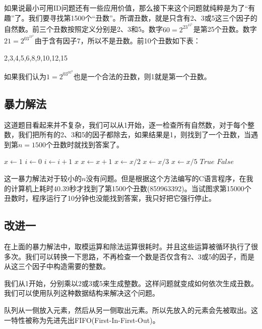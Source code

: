 \documentclass[UTF8]{article}
\begin{document}
如果说最小可用ID问题还有一些应用价值，那么接下来这个问题就纯粹是为了“有趣”了。我们要寻找第1500个“丑数”。所谓丑数，就是只含有2、3或5这三个因子的自然数。前三个丑数按照定义分别是2、3和5。数字$60 = 2^23^15^1$是第25个丑数。数字$21 = 2^03^17^1$由于含有因子7，所以不是丑数。前10个丑数如下表：

2,3,4,5,6,8,9,10,12,15

如果我们认为$1=2^03^05^0$也是一个合法的丑数，则1就是第一个丑数。

\subsection{暴力解法}

这道题目看起来并不复杂，我们可以从1开始，逐一检查所有自然数，对于每个整数，我们把所有的2、3和5的因子都除去，如果结果是1，则找到了一个丑数，当遇到第$n=1500$个丑数时就找到答案了。

\begin{algorithmic}[1]
  \State $x \gets 1$
  \State $i \gets 0$
  \Loop
      \State $i \gets i + 1$
        \State \Return $x$
      \EndIf
    \EndIf
    \State $x \gets x + 1$
  \EndLoop
\EndFunction
\Statex
{}
    \State $x \gets x / 2$
  \EndWhile
    \State $x \gets x / 3$
  \EndWhile
    \State $x \gets x / 5$
  \EndWhile
    \State \Return $True$
  \Else
    \State \Return $False$
  \EndIf
\EndFunction
\end{algorithmic}

这一暴力解法对于较小的$n$没有问题。但是根据这个方法编写的C语言程序，在我的计算机上耗时40.39秒才找到了第1500个丑数(859963392)。当试图求第15000个丑数时，程序运行了10分钟也没能找到答案，我只好把它强行停止。

\subsection{改进一}
在上面的暴力解法中，取模运算和除法运算很耗时\cite{Bentley}。并且这些运算被循环执行了很多次。我们可以转换一下思路，不再检查一个数是否仅含有2、3或5的因子，而是从这三个因子中构造需要的整数。

我们从1开始，分别乘以2或3或5来生成整数。这样问题就变成如何依次生成丑数。我们可以使用队列这种数据结构来解决这个问题。

队列从一侧放入元素，然后从另一侧取出元素。所以先放入的元素会先被取出。这一特性被称为先进先出FIFO(First-In-First-Out)。
\end{document}
